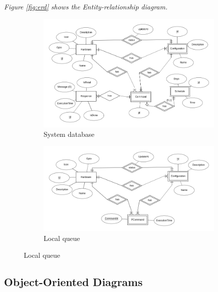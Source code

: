 \documentclass[12pt, oneside, a4paper]{book}
\begin{document}
			\textit{Figure \ref{fig:erd} shows the Entity-relationship diagram.} 
					\begin{figure}[H]
						\caption{Entity-relationship diagrams}
						\label{fig:erd}
						\begin{subfigure}[b]{\linewidth}
							\includegraphics[width=\linewidth]{img/diagram_er1.png}
							\caption{System database}
						\end{subfigure}

						\begin{subfigure}[b]{\linewidth}
							\includegraphics[width=\linewidth]{img/diagram_er2.png}
							\caption{Local queue}
						\end{subfigure}
					\end{figure}
				
			\newpage\subsection{Object-Oriented Diagrams}
\end{document}
